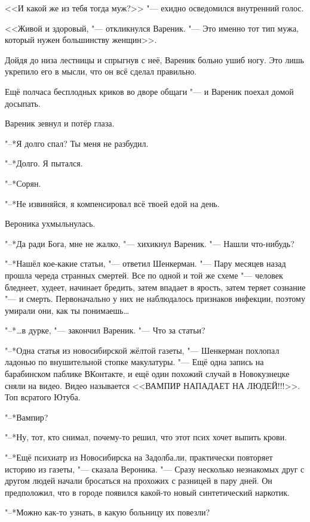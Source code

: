<<И какой же из тебя тогда муж?>> "--- ехидно осведомился внутренний голос.

<<Живой и здоровый, "--- откликнулся Вареник.
"--- Это именно тот тип мужа, который нужен большинству женщин>>.

Дойдя до низа лестницы и спрыгнув с неё, Вареник больно ушиб ногу.
Это лишь укрепило его в мысли, что он всё сделал правильно.

Ещё полчаса бесплодных криков во дворе общаги "--- и Вареник поехал домой досыпать.

\asterism

\textspace

Вареник зевнул и потёр глаза.

"--*Я долго спал?
Ты меня не разбудил.

"--*Долго.
Я пытался.

"--*Сорян.

"--*Не извиняйся, я компенсировал всё твоей едой на день.

Вероника ухмыльнулась.

"--*Да ради Бога, мне не жалко, "--- хихикнул Вареник.
"--- Нашли что-нибудь?

"--*Нашёл кое-какие статьи, "--- ответил Шенкерман.
"--- Пару месяцев назад прошла череда странных смертей.
Все по одной и той же схеме "--- человек бледнеет, худеет, начинает бредить, затем впадает в ярость, затем теряет сознание "--- и смерть.
Первоначально у них не наблюдалось признаков инфекции, поэтому умирали они, как ты понимаешь\ldots{}

"--*\ldots{}в дурке, "--- закончил Вареник.
"--- Что за статьи?

"--*Одна статья из новосибирской жёлтой газеты, "--- Шенкерман похлопал ладонью по внушительной стопке макулатуры.
"--- Ещё одна запись на барабинском паблике ВКонтакте, и ещё один похожий случай в Новокузнецке сняли на видео.
Видео называется <<ВАМПИР НАПАДАЕТ НА ЛЮДЕЙ!!!>>.
Топ всратого Ютуба.

"--*Вампир?

"--*Ну, тот, кто снимал, почему-то решил, что этот псих хочет выпить крови.

"--*Ещё психиатр из Новосибирска на Задолба.ли, практически повторяет историю из газеты, "--- сказала Вероника.
"--- Сразу несколько незнакомых друг с другом людей начали бросаться на прохожих с разницей в пару дней.
Он предположил, что в городе появился какой-то новый синтетический наркотик.

"--*Можно как-то узнать, в какую больницу их повезли?

